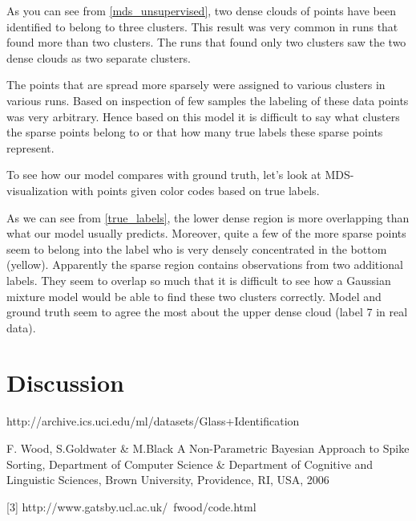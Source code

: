 \documentclass[a4paper]{article}
\begin{document}
As you can see from \ref{mds_unsupervised}, two dense clouds of points have been identified to belong to three clusters. This result was very common in runs that found more than two clusters. The runs that found only two clusters saw the two dense clouds as two separate clusters.

 The points that are spread more sparsely were assigned to various clusters in various runs. Based on inspection of few samples the labeling of these data points was very arbitrary. Hence based on this model it is difficult to say what clusters the sparse points belong to or that how many true labels these sparse points represent.

To see how our model compares with ground truth, let's look at MDS-visualization with points given color codes based on true labels.


As we can see from \ref{true_labels}, the lower dense region is more overlapping than what our model usually predicts. Moreover,  quite a few of the more sparse points seem to belong into the label who is very densely concentrated in the bottom (yellow). Apparently the sparse region contains observations from two additional labels. They seem to overlap so much that it is difficult to see how a Gaussian mixture model would be able to find these two clusters correctly. Model and ground truth seem to agree the most about the upper dense cloud (label 7 in real data). 

\section{Discussion}

\par
[1] http://archive.ics.uci.edu/ml/datasets/Glass+Identification
\par
[2] F. Wood, S.Goldwater \& M.Black A Non-Parametric Bayesian Approach to Spike Sorting, Department of Computer Science \& Department of Cognitive and Linguistic Sciences, Brown University, Providence, RI, USA, 2006

[3] http://www.gatsby.ucl.ac.uk/~fwood/code.html

\end{document}
